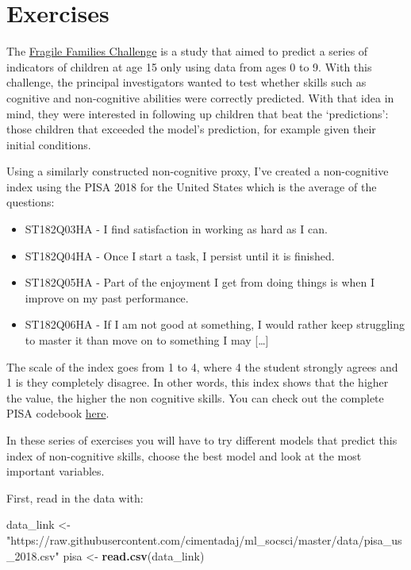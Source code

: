 \documentclass[
]{book}
\newenvironment{Shaded}{\begin{snugshade}}{\end{snugshade}}
\newcommand{\KeywordTok}[1]{\textcolor[rgb]{0.13,0.29,0.53}{\textbf{#1}}}
\newcommand{\NormalTok}[1]{#1}
\newcommand{\StringTok}[1]{\textcolor[rgb]{0.31,0.60,0.02}{#1}}
\providecommand{\tightlist}{%
  \setlength{\itemsep}{0pt}\setlength{\parskip}{0pt}}
\begin{document}
\hypertarget{exercises}{%
\section{Exercises}\label{exercises}}

The \href{https://www.fragilefamilieschallenge.org/}{Fragile Families Challenge} is a study that aimed to predict a series of indicators of children at age 15 only using data from ages 0 to 9. With this challenge, the principal investigators wanted to test whether skills such as cognitive and non-cognitive abilities were correctly predicted. With that idea in mind, they were interested in following up children that beat the `predictions': those children that exceeded the model's prediction, for example given their initial conditions.

Using a similarly constructed non-cognitive proxy, I've created a non-cognitive index using the PISA 2018 for the United States which is the average of the questions:

\begin{itemize}
\tightlist
\item
  ST182Q03HA - I find satisfaction in working as hard as I can.
\item
  ST182Q04HA - Once I start a task, I persist until it is finished.
\item
  ST182Q05HA - Part of the enjoyment I get from doing things is when I improve on my past performance.
\item
  ST182Q06HA - If I am not good at something, I would rather keep struggling to master it than move on to something I may {[}\ldots{]}
\end{itemize}

The scale of the index goes from 1 to 4, where 4 the student strongly agrees and 1 is they completely disagree. In other words, this index shows that the higher the value, the higher the non cognitive skills. You can check out the complete PISA codebook \href{https://docs.google.com/spreadsheets/d/12--3vD737rcu6olviKutRLEiyKNZ2bynXcJ4CpwtNsQ/edit?usp=sharing}{here}.

In these series of exercises you will have to try different models that predict this index of non-cognitive skills, choose the best model and look at the most important variables.

First, read in the data with:

\begin{Shaded}
\begin{Highlighting}[]
\NormalTok{data_link <-}\StringTok{ "https://raw.githubusercontent.com/cimentadaj/ml_socsci/master/data/pisa_us_2018.csv"}
\NormalTok{pisa <-}\StringTok{ }\KeywordTok{read.csv}\NormalTok{(data_link)}
\end{Highlighting}
\end{Shaded}
\end{document}
